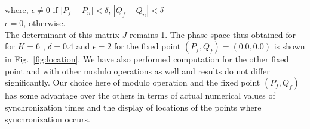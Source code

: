 \documentclass[reprint,superscriptaddress,amsmath,amssymb,aps,pre]{revtex4-1}
\begin{document}
\vspace{0.2cm}
	where, $ \epsilon \neq 0$ if $|P_f - P_n| < \delta$, $|Q_f - Q_n| < 
	\delta$\\ $\epsilon = 0$, otherwise.\\

The determinant of this matrix $J$ remains 1. The phase space thus obtained 
for for $K = 6$ , $\delta = 0.4$ and $\epsilon = 2$ for the fixed point 
$(P_f,Q_f)=(0.0,0.0)$ is shown in Fig.~\ref{fig:location}.   We have also 
performed computation for the other fixed point and with other modulo 
operations as well and results do not differ significantly. Our choice here of 
modulo operation and the fixed point $(P_f,Q_f)$ has some advantage over the 
others in terms of actual numerical values of synchronization times and the 
display of locations of the points where synchronization occurs. 
\end{document}
